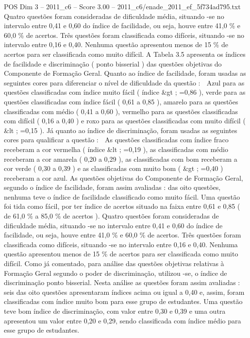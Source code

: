 \begin{textsample}{POS Dim 3 – 2011\_c6 – Score 3.00 – 2011\_c6/enade\_2011\_ef\_5f734ad795.txt}
Quatro questões foram consideradas de dificuldade média, situando -se no intervalo entre 0,41 e 0,60 do índice de facilidade, ou seja, houve entre 41,0 \% e 60,0 \% de acertos.
Três questões foram classificada como difíceis, situando -se no intervalo entre 0,16 e 0,40.
Nenhuma questão apresentou menos de 15 \% de acertos para ser classificada como muito difícil.
A Tabela 3.5 apresenta os índices de facilidade e discriminação ( ponto bisserial ) das questões objetivas do Componente de Formação Geral.
Quanto ao índice de facilidade, foram usadas as seguintes cores para diferenciar o nível de dificuldade da questão :  Azul para as questões classificadas com índice muito fácil ( índice \&gt ; =0,86 ), verde para as questões classificadas com índice fácil ( 0,61 a 0,85 ), amarelo para as questões classificadas com médio ( 0,41 a 0,60 ), vermelho para as questões classificadas com difícil ( 0,16 a 0,40 ) e roxo para as questões classificadas com muito difícil ( \&lt ; =0,15 ).
Já quanto ao índice de discriminação, foram usadas as seguintes cores para qualificar a questão :  As questões classificadas com índice fraco receberam a cor vermelha ( índice \&lt ; =0,19 ), as classificadas com médio receberam a cor amarela ( 0,20 a 0,29 ), as classificadas com bom receberam a cor verde ( 0,30 a 0,39 ) e as classificadas com muito bom ( \&gt ; =0,40 ) receberam a cor azul.
As questões objetivas do Componente de Formação Geral, segundo o índice de facilidade, foram assim avaliadas : das oito questões, nenhuma teve o índice de facilidade classificado como muito fácil.
Uma questão foi tida como fácil, por ter índice de acertos situado na faixa entre 0,61 e 0,85 ( de 61,0 \% a 85,0 \% de acertos ).
Quatro questões foram consideradas de dificuldade média, situando -se no intervalo entre 0,41 e 0,60 do índice de facilidade, ou seja, houve entre 41,0 \% e 60,0 \% de acertos.
Três questões foram classificada como difíceis, situando -se no intervalo entre 0,16 e 0,40.
Nenhuma questão apresentou menos de 15 \% de acertos para ser classificada como muito difícil.
Como já comentado, para análise das questões objetivas relativas à Formação Geral segundo o poder de discriminação, utilizou -se, o índice de discriminação ponto bisserial.
Nesta análise as questões foram assim avaliadas : seis das oito questões apresentaram índices acima ou igual a 0,40 e, assim, foram classificadas com índice muito bom para esse grupo de estudantes.
Uma questão teve bom índice de discriminação, com valor entre 0,30 e 0,39 e uma outra apresentou um valor entre 0,20 e 0,29, sendo classificada com índice médio para esse grupo de estudantes.

\end{textsample}
